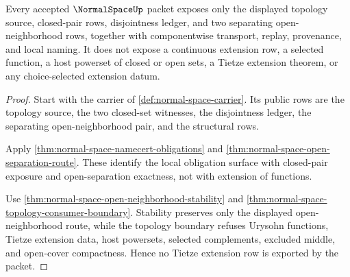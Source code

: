 \begin{theorem}
\label{thm:normal-space-tietze-extension-refusal}
Every accepted $\NormalSpaceUp$ packet exposes only the displayed topology source, closed-pair rows, disjointness ledger, and two separating open-neighborhood rows, together with componentwise transport, replay, provenance, and local naming. It does not expose a continuous extension row, a selected function, a host powerset of closed or open sets, a Tietze extension theorem, or any choice-selected extension datum.
\end{theorem}
\begin{proof}
Start with the carrier of \autoref{def:normal-space-carrier}. Its public rows are the topology source, the two closed-set witnesses, the disjointness ledger, the separating open-neighborhood pair, and the structural rows.

Apply \autoref{thm:normal-space-namecert-obligations} and \autoref{thm:normal-space-open-separation-route}. These identify the local obligation surface with closed-pair exposure and open-separation exactness, not with extension of functions.

Use \autoref{thm:normal-space-open-neighborhood-stability} and \autoref{thm:normal-space-topology-consumer-boundary}. Stability preserves only the displayed open-neighborhood route, while the topology boundary refuses Urysohn functions, Tietze extension data, host powersets, selected complements, excluded middle, and open-cover compactness. Hence no Tietze extension row is exported by the packet.
\end{proof}


